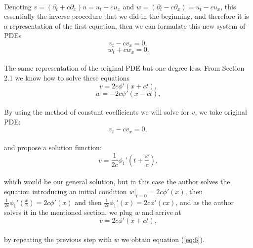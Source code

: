 \documentclass{article}
\begin{document}
\paragraph{}Denoting  $v = (\partial_t + c\partial_x)u = u_t + cu_x$ and $w = (\partial_t - c\partial_x) = u_t - cu_x$, this essentially the inverse procedure that we did in the beginning, and therefore it is a representation of the first equation, then we can formulate this new system of PDEs
\begin{equation}
v_t - cv_x = 0,\label{eq:3}
\end{equation}
\begin{equation}
w_t + cw_x = 0.\label{eq:4}
\end{equation}
\paragraph{}The same representation of the original PDE but one degree less. From Section 2.1 we know how to solve these equations
\begin{equation}
v = 2c\phi'(x + ct)\label{eq:5},
\end{equation}
\begin{equation}
w = -2c\psi'(x - ct)\label{eq:6},
\end{equation}
\paragraph{}By using the method of constant coefficients we will solve for $v$, we take original PDE:
$$v_t - c v_x = 0,$$
\paragraph{}and propose a solution function:
$$v = \frac{1}{2c}\phi_1'\left(t + \frac{x}{c}\right),$$
\paragraph{}which would be our general solution, but in this case the author solves the equation introducing an initial condition $w|_{t=0} = 2c\phi'(x)$, then  $\frac{1}{2c}\phi_1'(\frac{x}{c}) = 2c\phi'(x)$ and then $\frac{1}{2c}\phi_1'(x) = 2c\phi'(cx)$, and as the author solves it in the mentioned section, we plug $w$ and arrive at
$$v = 2c\phi'(x + ct),$$
\paragraph{} by repeating the  previous step with $w$ we obtain equation (\ref{eq:6}).
\end{document}
